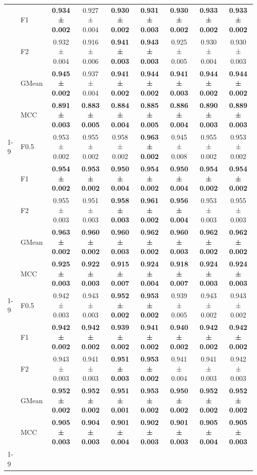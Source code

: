 \begin{table}[H]
{\begin{tabular}{llccccccc}
 & F1 & \textbf{0.934 ± 0.002} & 0.927 ± 0.004 & \textbf{0.930 ± 0.002} & \textbf{0.931 ± 0.003} & \textbf{0.930 ± 0.002} & \textbf{0.933 ± 0.002} & \textbf{0.933 ± 0.002} \\
 & F2 & 0.932 ± 0.004 & 0.916 ± 0.006 & \textbf{0.941 ± 0.003} & \textbf{0.943 ± 0.003} & 0.925 ± 0.005 & 0.930 ± 0.004 & 0.930 ± 0.003 \\
 & GMean & \textbf{0.945 ± 0.002} & 0.937 ± 0.004 & \textbf{0.941 ± 0.002} & \textbf{0.944 ± 0.002} & \textbf{0.941 ± 0.003} & \textbf{0.944 ± 0.002} & \textbf{0.944 ± 0.002} \\
 & MCC & \textbf{0.891 ± 0.003} & \textbf{0.883 ± 0.005} & \textbf{0.884 ± 0.004} & \textbf{0.885 ± 0.005} & \textbf{0.886 ± 0.004} & \textbf{0.890 ± 0.003} & \textbf{0.889 ± 0.003} \\
\cline{1-9}
\multirow[t]{5}{*}{TabPFN} & F0.5 & 0.953 ± 0.002 & 0.955 ± 0.002 & 0.958 ± 0.002 & \textbf{0.963 ± 0.002} & 0.945 ± 0.008 & 0.955 ± 0.002 & 0.953 ± 0.002 \\
 & F1 & \textbf{0.954 ± 0.002} & \textbf{0.953 ± 0.002} & \textbf{0.950 ± 0.004} & \textbf{0.954 ± 0.002} & \textbf{0.950 ± 0.004} & \textbf{0.954 ± 0.002} & \textbf{0.954 ± 0.002} \\
 & F2 & 0.955 ± 0.003 & 0.951 ± 0.003 & \textbf{0.958 ± 0.003} & \textbf{0.961 ± 0.002} & \textbf{0.956 ± 0.004} & 0.953 ± 0.003 & 0.955 ± 0.003 \\
 & GMean & \textbf{0.963 ± 0.002} & \textbf{0.960 ± 0.002} & \textbf{0.960 ± 0.003} & \textbf{0.962 ± 0.002} & \textbf{0.960 ± 0.003} & \textbf{0.962 ± 0.002} & \textbf{0.962 ± 0.002} \\
 & MCC & \textbf{0.925 ± 0.003} & \textbf{0.922 ± 0.003} & \textbf{0.915 ± 0.007} & \textbf{0.924 ± 0.004} & \textbf{0.918 ± 0.007} & \textbf{0.924 ± 0.003} & \textbf{0.924 ± 0.003} \\
\cline{1-9}
\multirow[t]{5}{*}{XGBoost} & F0.5 & 0.942 ± 0.003 & 0.943 ± 0.003 & \textbf{0.952 ± 0.002} & \textbf{0.953 ± 0.002} & 0.939 ± 0.005 & 0.943 ± 0.002 & 0.943 ± 0.002 \\
 & F1 & \textbf{0.942 ± 0.002} & \textbf{0.942 ± 0.002} & \textbf{0.939 ± 0.002} & \textbf{0.941 ± 0.002} & \textbf{0.940 ± 0.002} & \textbf{0.942 ± 0.002} & \textbf{0.942 ± 0.002} \\
 & F2 & 0.943 ± 0.003 & 0.941 ± 0.003 & \textbf{0.951 ± 0.003} & \textbf{0.953 ± 0.002} & 0.941 ± 0.004 & 0.941 ± 0.003 & 0.942 ± 0.003 \\
 & GMean & \textbf{0.952 ± 0.002} & \textbf{0.952 ± 0.002} & \textbf{0.951 ± 0.001} & \textbf{0.953 ± 0.002} & \textbf{0.950 ± 0.002} & \textbf{0.952 ± 0.002} & \textbf{0.952 ± 0.002} \\
 & MCC & \textbf{0.905 ± 0.003} & \textbf{0.904 ± 0.003} & \textbf{0.901 ± 0.004} & \textbf{0.902 ± 0.003} & \textbf{0.901 ± 0.003} & \textbf{0.905 ± 0.004} & \textbf{0.905 ± 0.003} \\
\cline{1-9}
\bottomrule
\end{tabular}
    }
\end{table}

